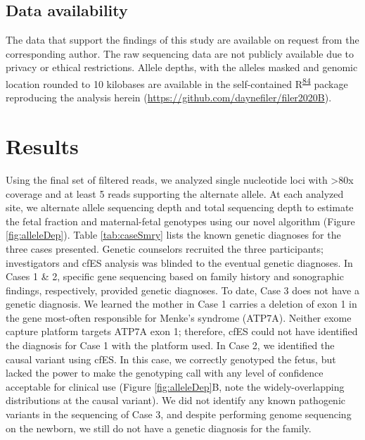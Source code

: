 \documentclass[11pt,letterpaper]{book}
\begin{document}
\hypertarget{data-availability}{%
\subsection{Data availability}\label{data-availability}}

The data that support the findings of this study are available on request from the corresponding author.
The raw sequencing data are not publicly available due to privacy or ethical restrictions.
Allele depths, with the alleles masked and genomic location rounded to 10 kilobases are available in the self-contained R\textsuperscript{\protect\hyperlink{ref-r-core-team:2019aa}{84}} package reproducing the analysis herein (\url{https://github.com/daynefiler/filer2020B}).

\hypertarget{results-1}{%
\section{Results}\label{results-1}}

Using the final set of filtered reads, we analyzed single nucleotide loci with \textgreater80x coverage and at least 5 reads supporting the alternate allele.
At each analyzed site, we alternate allele sequencing depth and total sequencing depth to estimate the fetal fraction and maternal-fetal genotypes using our novel algorithm (Figure \ref{fig:alleleDep}).
Table \ref{tab:caseSmry} lists the known genetic diagnoses for the three cases presented.
Genetic counselors recruited the three participants; investigators and cfES analysis was blinded to the eventual genetic diagnoses.
In Cases 1 \& 2, specific gene sequencing based on family history and sonographic findings, respectively, provided genetic diagnoses.
To date, Case 3 does not have a genetic diagnosis.
We learned the mother in Case 1 carries a deletion of exon 1 in the gene most-often responsible for Menke's syndrome (ATP7A).
Neither exome capture platform targets ATP7A exon 1; therefore, cfES could not have identified the diagnosis for Case 1 with the platform used.
In Case 2, we identified the causal variant using cfES.
In this case, we correctly genotyped the fetus, but lacked the power to make the genotyping call with any level of confidence acceptable for clinical use (Figure \ref{fig:alleleDep}B, note the widely-overlapping distributions at the causal variant).
We did not identify any known pathogenic variants in the sequencing of Case 3, and despite performing genome sequencing on the newborn, we still do not have a genetic diagnosis for the family.
\end{document}
